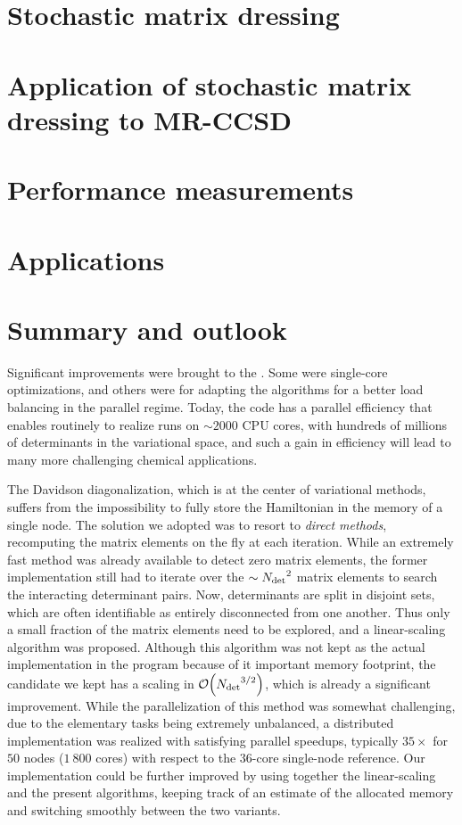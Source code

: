 \documentclass[12pt,a4paper]{report}
\begin{document}
\chapter{Stochastic matrix dressing}
\minitoc


\chapter{Application of stochastic matrix dressing to MR-CCSD}
\minitoc


\chapter{Performance measurements}
\minitoc


\chapter{Applications}
\minitoc


\chapter{Summary and outlook}

Significant improvements were brought to the \QP. Some were single-core
optimizations, and others were for adapting the algorithms for a better load
balancing in the parallel regime. Today, the code has a parallel efficiency
that enables routinely to realize runs on $\sim 2000$ CPU cores, with
hundreds of millions of determinants in the variational space, and such a gain
in efficiency will lead to many more challenging chemical applications.

The Davidson diagonalization, which is at the center of variational methods, suffers from the impossibility to fully store the Hamiltonian in the memory of a single node. The solution we adopted was to resort to \emph{direct methods}, recomputing the matrix elements on the fly at each iteration. While an extremely fast method was already available to detect zero matrix elements,\cite{Scemama_2013} the former implementation still had to iterate over the $\sim {N_\text{det}}^2$ matrix elements to search the interacting determinant pairs. Now, determinants are split in disjoint sets, which are often identifiable as entirely disconnected from one another. Thus only a small fraction of the matrix elements need to be explored, and a linear-scaling algorithm was proposed. Although this algorithm was not kept as the actual implementation in the program because of it important memory footprint, the candidate we kept has a scaling in $\order{\Ndet^{3/2}}$, which is already a significant improvement.
While the parallelization of this method was somewhat challenging, due to the elementary tasks being extremely unbalanced, a distributed implementation was realized with satisfying parallel speedups, typically $35\times$ for $50$ nodes ($1~800$ cores) with respect to the $36$-core single-node reference.
Our implementation could be further improved by using together the linear-scaling and the present
algorithms, keeping track of an estimate of the allocated memory and switching smoothly between the
two variants.
\end{document}
